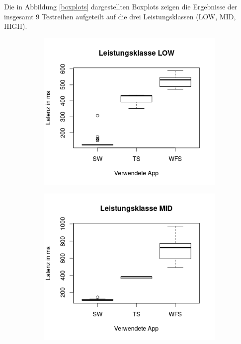 Die in Abbildung \ref{boxplots} dargestellten Boxplots zeigen die Ergebnisse der insgesamt 9 Testreihen aufgeteilt auf die drei Leistungsklassen (LOW, MID, HIGH).


\begin{figure}[H]
\begin{subfigure}[b]{0.5\textwidth}
\includegraphics[width=\textwidth]{img/boxplotlow.png}
\end{subfigure}
\begin{subfigure}[b]{0.5\textwidth}
\includegraphics[width=\textwidth]{img/boxplotmid.png}

\end{subfigure}
\end{figure}
